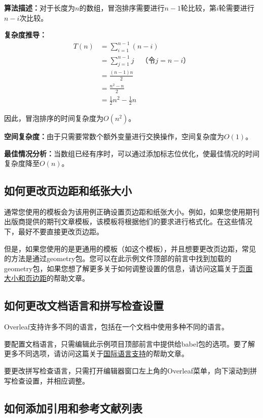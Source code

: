 \documentclass{article}
\begin{document}
\textbf{算法描述：}对于长度为$n$的数组，冒泡排序需要进行$n-1$轮比较，第$i$轮需要进行$n-i$次比较。

\textbf{复杂度推导：}
\begin{align}
T(n) &= \sum_{i=1}^{n-1} (n-i) \\
&= \sum_{j=1}^{n-1} j \quad \text{（令$j = n-i$）} \\
&= \frac{(n-1)n}{2} \\
&= \frac{n^2 - n}{2} \\
&= \frac{1}{2}n^2 - \frac{1}{2}n
\end{align}

因此，冒泡排序的时间复杂度为$O(n^2)$。

\textbf{空间复杂度：}由于只需要常数个额外变量进行交换操作，空间复杂度为$O(1)$。

\textbf{最佳情况分析：}当数组已经有序时，可以通过添加标志位优化，使最佳情况的时间复杂度降至$O(n)$。


\subsection{如何更改页边距和纸张大小}

通常您使用的模板会为该用例正确设置页边距和纸张大小。例如，如果您使用期刊出版商提供的期刊文章模板，该模板将根据他们的要求进行格式化。在这些情况下，最好不要直接更改页边距。

但是，如果您使用的是更通用的模板（如这个模板），并且想要更改页边距，常见的方法是通过geometry包。您可以在此示例文件顶部的前言中找到加载的geometry包，如果您想了解更多关于如何调整设置的信息，请访问这篇关于\href{https://www.overleaf.com/learn/latex/page_size_and_margins}{页面大小和页边距}的帮助文章。

\subsection{如何更改文档语言和拼写检查设置}

Overleaf支持许多不同的语言，包括在一个文档中使用多种不同的语言。

要配置文档语言，只需编辑此示例项目顶部前言中提供给babel包的选项。要了解更多不同选项，请访问这篇关于\href{https://www.overleaf.com/learn/latex/International_language_support}{国际语言支持}的帮助文章。

要更改拼写检查语言，只需打开编辑器窗口左上角的Overleaf菜单，向下滚动到拼写检查设置，并相应调整。

\subsection{如何添加引用和参考文献列表}
\end{document}
